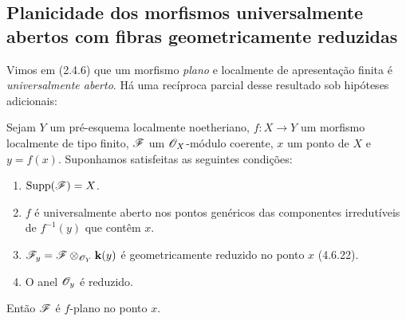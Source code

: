 \subsection{Planicidade dos morfismos universalmente abertos com fibras geometricamente reduzidas}
\label{subsection:IV.15.2}

\begin{env}[15.2.1]
\label{IV.15.2.1}
Vimos em (2.4.6) que um morfismo \emph{plano} e localmente de apresentação finita é \emph{universalmente aberto}. Há uma recíproca parcial desse resultado sob hipóteses adicionais:
\end{env}

\begin{theorem}[15.2.2]
\label{IV.15.2.2}
Sejam $Y$ um pré-esquema localmente noetheriano, $f:X\to Y$ um morfismo localmente de tipo finito, $\mathscr{F}$ um $\mathscr{O}_X$-módulo coerente, $x$ um ponto de $X$ e $y=f(x)$. Suponhamos satisfeitas as seguintes condições:
\begin{enumerate}[label=(\roman*)]
  \item $\operatorname{Supp}(\mathscr{F})=X$.
  \item $f$ é universalmente aberto nos pontos genéricos das componentes irredutíveis de $f^{-1}(y)$ que contêm $x$.
  \item $\mathscr{F}_y=\mathscr{F}\otimes_{\mathscr{O}_Y}\mathbf{k}(y)$ é geometricamente reduzido no ponto $x$ (4.6.22).
  \item O anel $\mathscr{O}_y$ é reduzido.
\end{enumerate}
Então $\mathscr{F}$ é $f$-plano no ponto $x$.
\end{theorem}

